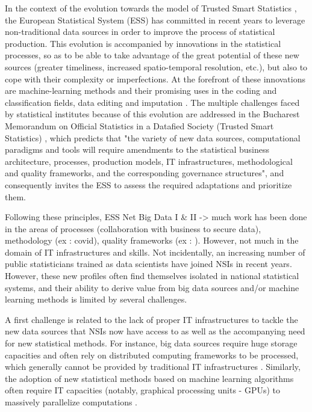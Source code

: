 In the context of the evolution towards the model of Trusted Smart Statistics \cite{ricciato2019trusted}, the European Statistical System (ESS) has committed in recent years to leverage non-traditional data sources in order to improve the process of statistical production. This evolution is accompanied by innovations in the statistical processes, so as to be able to take advantage of the great potential of these new sources (greater timeliness, increased spatio-temporal resolution, etc.), but also to cope with their complexity or imperfections. At the forefront of these innovations are machine-learning methods and their promising uses in the coding and classification fields, data editing and imputation \cite{gjaltema2022high}. The multiple challenges faced by statistical institutes because of this evolution are addressed in the Bucharest Memorandum on Official Statistics in a Datafied Society (Trusted Smart Statistics) \cite{bucharest2018}, which predicts that "the variety of new data sources, computational paradigms and tools will require amendments to the statistical business architecture, processes, production models, IT infrastructures, methodological and quality frameworks, and the corresponding governance structures", and consequently invites the ESS to assess the required adaptations and prioritize them.

Following these principles, ESS Net Big Data I \& II -> much work has been done in the areas of processes (collaboration with business to secure data), methodology (ex : covid), quality frameworks (ex : ). However, not much in the domain of IT infrastructures and skills. Not incidentally, an increasing number of public statisticians trained as data scientists have joined NSIs in recent years. However, these new profiles often find themselves isolated in national statistical systems, and their ability to derive value from big data sources and/or machine learning methods is limited by several challenges. 

A first challenge is related to the lack of proper IT infrastructures to tackle the new data sources that NSIs now have access to as well as the accompanying need for new statistical methods. For instance, big data sources require huge storage capacities and often rely on distributed computing frameworks to be processed, which generally cannot be provided by traditional IT infrastructures \cite{liu2013computing}. Similarly, the adoption of new statistical methods based on machine learning algorithms often require IT capacities (notably, graphical processing units - GPUs) to massively parallelize computations \cite{saiyeda2017cloud}.

